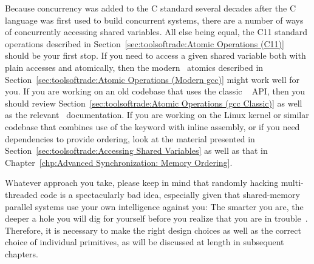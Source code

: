 \QuickQuizEnd

Because concurrency was added to the C standard several decades after
the C language was first used to build concurrent systems, there are
a number of ways of concurrently accessing shared variables.
All else being equal, the C11 standard operations described in
Section~\ref{sec:toolsoftrade:Atomic Operations (C11)}
should be your first stop.
If you need to access a given shared variable both with plain accesses
and atomically, then the modern \GCC\ atomics described in
Section~\ref{sec:toolsoftrade:Atomic Operations (Modern gcc)}
might work well for you.
If you are working on an old codebase that uses the classic \GCC\ 
API, then you should review
Section~\ref{sec:toolsoftrade:Atomic Operations (gcc Classic)}
as well as the relevant \GCC\ documentation.
If you are working on the Linux kernel or similar codebase that
combines use of the  keyword with inline assembly,
or if you need dependencies to provide ordering, look at the material
presented in Section~\ref{sec:toolsoftrade:Accessing Shared Variables}
as well as that in
Chapter~\ref{chp:Advanced Synchronization: Memory Ordering}.

Whatever approach you take, please keep in mind that randomly hacking
multi-threaded code is a spectacularly bad idea, especially given that
shared-memory parallel systems use your own intelligence against you:
The smarter you are, the deeper a hole you will dig for yourself before
you realize that you are in trouble~\cite{DeadlockEmpire2016}.
Therefore, it is necessary to make the right design choices as well as
the correct choice of individual primitives,
as will be discussed at length in subsequent chapters.

